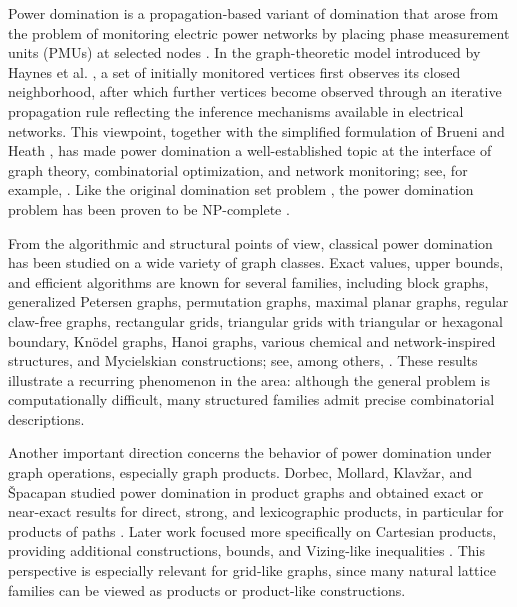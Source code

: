 \documentclass[letterpaper,12pt]{article}
\begin{document}
Power domination is a propagation-based variant of domination that arose from the problem of monitoring electric power networks by placing phase measurement units (PMUs) at selected nodes   \cite{BrueniHeath2005}. In the graph-theoretic model introduced by Haynes et al. \cite{HaynesHedetniemiHedetniemiHenning2002}, a set of initially monitored vertices first observes its closed neighborhood, after which further vertices become observed through an iterative propagation rule reflecting the inference mechanisms available in electrical networks. This viewpoint, together with the simplified formulation of Brueni and Heath \cite{BrueniHeath2005}, has made power domination a well-established topic at the interface of graph theory, combinatorial optimization, and network monitoring; see, for example, \cite{ZhaoKangChang2006,Liao2016,FerreroHogbenKenterYoung2017,WhitlatchShultisRamirezOrtizKniahnitskaya2023}. Like the original domination set problem \cite{Haynes1998}, the power domination problem has been proven to be NP-complete \cite{Guo_2008}.

From the algorithmic and structural points of view, classical power domination has been studied on a wide variety of graph classes. Exact values, upper bounds, and efficient algorithms are known for several families, including block graphs, generalized Petersen graphs, permutation graphs, maximal planar graphs, regular claw-free graphs, rectangular grids, triangular grids with triangular or hexagonal boundary, Kn\"odel graphs, Hanoi graphs, various chemical and network-inspired structures, and Mycielskian constructions; see, among others, \cite{Dorfling2006,Ferrero2016,XuKangShanZhao2006,XuKang2011,Wilson2019,DorbecGonzalezPennarun2019,LuMaoWang2020,BoseGledelPennarunVerdonschot2020,StephenRajanRyanGrigoriousWilliam2015,VargheseVijayakumarHinz2018,SundaraRajanArulanandPrabhuRajasingh2023,SreethuKVargheseVarghese2024}. These results illustrate a recurring phenomenon in the area: although the general problem is computationally difficult, many structured families admit precise combinatorial descriptions.

Another important direction concerns the behavior of power domination under graph operations, especially graph products. Dorbec, Mollard, Klav\v zar, and \v Spacapan studied power domination in product graphs and obtained exact or near-exact results for direct, strong, and lexicographic products, in particular for products of paths \cite{DorbecMollardKlavzarSpacapan2008}. Later work focused more specifically on Cartesian products, providing additional constructions, bounds, and Vizing-like inequalities \cite{KohSoh2016,AndersonKuenzel2022}. This perspective is especially relevant for grid-like graphs, since many natural lattice families can be viewed as products or product-like constructions.
\end{document}
